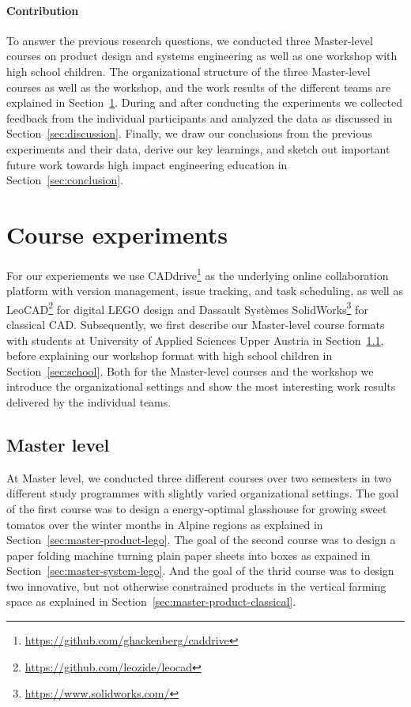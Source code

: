 \documentclass{PDS}
\begin{document}
\paragraph{Contribution}

To answer the previous research questions, we conducted three Master-level courses on product design and systems engineering as well as one workshop with high school children.
The organizational structure of the three Master-level courses as well as the workshop, and the work results of the different teams are explained in Section~\ref{sec:contribution}.
During and after conducting the experiments we collected feedback from the individual participants and analyzed the data as discussed in Section~\ref{sec:discussion}.
Finally, we draw our conclusions from the previous experiments and their data, derive our key learnings, and sketch out important future work towards high impact engineering education in Section~\ref{sec:conclusion}.

\section{Course experiments}
\label{sec:contribution}

For our experiements we use CADdrive\footnote{\url{https://github.com/ghackenberg/caddrive}} as the underlying online collaboration platform with version management, issue tracking, and task scheduling, as well as LeoCAD\footnote{\url{https://github.com/leozide/leocad}} for digital LEGO design and  Dassault Systèmes SolidWorks\footnote{\url{https://www.solidworks.com/}} for classical CAD.
Subsequently, we first describe our Master-level course formats with students at University of Applied Sciences Upper Austria in Section~\ref{sec:master}, before explaining our workshop format with high school children in Section~\ref{sec:school}.
Both for the Master-level courses and the workshop we introduce the organizational settings and show the most interesting work results delivered by the individual teams.

\subsection{Master level}
\label{sec:master}

At Master level, we conducted three different courses over two semesters in two different study programmes with slightly varied organizational settings.
The goal of the first course was to design a energy-optimal glasshouse for growing sweet tomatos over the winter months in Alpine regions as explained in Section~\ref{sec:master-product-lego}.
The goal of the second course was to design a paper folding machine turning plain paper sheets into boxes as expained in Section~\ref{sec:master-system-lego}.
And the goal of the thrid course was to design two innovative, but not otherwise constrained products in the vertical farming space as explained in Section~\ref{sec:master-product-classical}.
\end{document}
